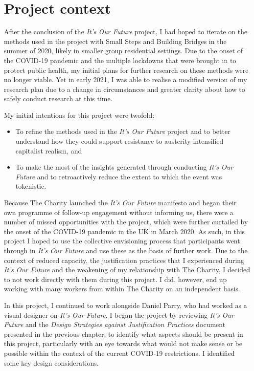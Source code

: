 \section{Project context}
\label{sec:8-1-context}
After the conclusion of the \textit{It's Our Future} project, I had hoped to iterate on the methods used in the project with Small Steps and Building Bridges in the summer of 2020, likely in smaller group residential settings.  Due to the onset of the COVID-19 pandemic and the multiple lockdowns that were brought in to protect public health, my initial plans for further research on these methods were no longer viable. Yet in early 2021, I was able to realise a modified version of my research plan due to a change in circumstances and greater clarity about how to safely conduct research at this time.

My initial intentions for this project were twofold: 
\begin{itemize}
    \item To refine the methods used in the \emph{It's Our Future} project and to better understand how they could support resistance to austerity-intensified capitalist realism, and 
    \item To make the most of the insights generated through conducting \emph{It's Our Future} and to retroactively reduce the extent to which the event was tokenistic.
\end{itemize}
Because The Charity launched the \emph{It's Our Future} manifesto and began their own programme of follow-up engagement without informing us, there were a number of missed opportunities with the project, which were further curtailed by the onset of the COVID-19 pandemic in the UK in March 2020. As such, in this project I hoped to use the collective envisioning process that participants went through in \emph{It's Our Future} and use these as the basis of further work. Due to the context of reduced capacity, the justification practices that I experienced during \emph{It's Our Future} and the weakening of my relationship with The Charity, I decided to not work directly with them during this project. I did, however, end up working with many workers from within The Charity on an independent basis.

In this project, I continued to work alongside Daniel Parry, who had worked as a visual designer on \textit{It's Our Future}. I began the project by reviewing \emph{It's Our Future} and the \emph{Design Strategies against Justification Practices} document presented in the previous chapter, to identify what aspects should be present in this project, particularly with an eye towards what would not make sense or be possible within the context of the current COVID-19 restrictions.  I identified some key design considerations. 

